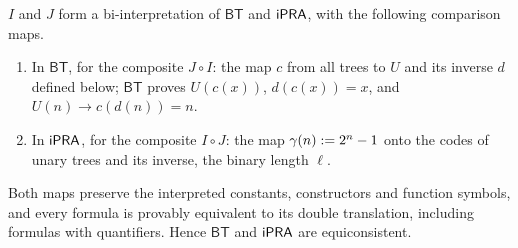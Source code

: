 \begin{theorem}\label{ctr:thm:bt}
$I$ and $J$ form a bi-interpretation of $\mathsf{BT}$ and $\mathsf{iPRA}$, with the following comparison
maps.
\begin{enumerate}
\item In $\mathsf{BT}$, for the composite $J\circ I$: the map $c$ from all trees to $U$ and its
inverse $d$ defined below; $\mathsf{BT}$ proves $U(c(x))$, $d(c(x))=x$, and
$U(n)\to c(d(n))=n$.
\item In $\mathsf{iPRA}$, for the composite $I\circ J$: the map $\gamma(n)\mathrel{:=} 2^n-1$ onto the
codes of unary trees and its inverse, the binary length $\ell$.
\end{enumerate}
Both maps preserve the interpreted constants, constructors and function symbols, and every
formula is provably equivalent to its double translation, including formulas with
quantifiers. Hence $\mathsf{BT}$ and $\mathsf{iPRA}$ are equiconsistent.
\end{theorem}
